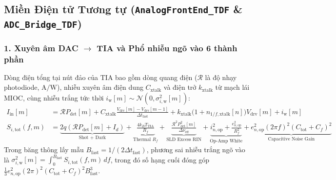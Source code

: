 \documentclass[11pt, a4paper]{article}
\begin{document}
\subsection{Miền Điện tử Tương tự (\texttt{AnalogFrontEnd\_TDF} \& \texttt{ADC\_Bridge\_TDF})}

\subsubsection*{1. Xuyên âm DAC $\rightarrow$ TIA và Phổ nhiễu ngõ vào 6 thành phần}
Dòng điện tổng tại nút đảo của TIA bao gồm dòng quang điện ($\mathcal{R}$ là độ nhạy photodiode, $\text{A/W}$), nhiễu xuyên âm điện dung $C_{\text{xtalk}}$ và điện trở $k_{\text{xtalk}}$ từ mạch lái MIOC, cùng nhiễu trắng tức thời $i_{\text{w}}[m] \sim \mathcal{N}(0, \sigma_{i,\text{w}}^2[m])$:
\begin{align}
I_{\text{in}}[m] &= \mathcal{R} P_{\text{det}}[m] + C_{\text{xtalk}}\frac{V_{\text{drv}}[m] - V_{\text{drv}}[m-1]}{\Delta t_{\text{fast}}} + k_{\text{xtalk}}\bigl(1 + n_{1/f,\text{xtalk}}[n]\bigr)V_{\text{drv}}[m] + i_{\text{w}}[m] \\
S_{i,\text{tot}}(f, m) &= \underbrace{2q(\mathcal{R}P_{\text{det}}[m] + I_d)}_{\text{Shot + Dark}} + \underbrace{\frac{4k_B T_{\text{TIA}}}{R_f}}_{\text{Thermal } R_f} + \underbrace{\frac{\mathcal{R}^2 P_{\text{det}}^2[m]}{\Delta\nu_{\text{eff}}}}_{\text{SLD Excess RIN}} + \underbrace{i_{n,\text{op}}^2 + \frac{e_{n,\text{op}}^2}{R_f^2}}_{\text{Op-Amp White}} + \underbrace{e_{n,\text{op}}^2 (2\pi f)^2 (C_{\text{tot}} + C_f)^2}_{\text{Capacitive Noise Gain}}
\end{align}
Trong băng thông lấy mẫu $B_{\text{fast}} = 1/(2\Delta t_{\text{fast}})$, phương sai nhiễu trắng ngõ vào là $\sigma_{i,\text{w}}^2[m] = \int_0^{B_{\text{fast}}} S_{i,\text{tot}}(f, m)\,df$, trong đó số hạng cuối đóng góp $\frac{1}{3} e_{n,\text{op}}^2 (2\pi)^2 (C_{\text{tot}} + C_f)^2 B_{\text{fast}}^3$.
\end{document}
